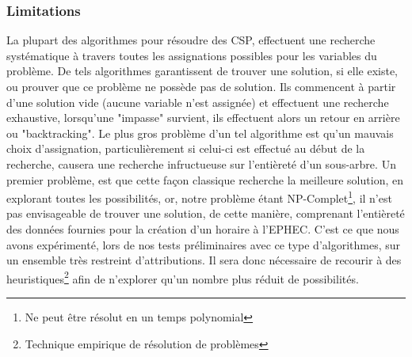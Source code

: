 \subsubsection{Limitations}
La plupart des algorithmes pour résoudre des CSP, effectuent une recherche systématique à travers toutes les assignations possibles pour les variables du problème. De tels algorithmes garantissent de trouver une solution, si elle existe, ou prouver que ce problème ne possède pas de solution.  
Ils commencent à partir d'une solution vide (aucune variable n'est assignée) et effectuent une recherche exhaustive,
lorsqu'une "impasse" survient, ils effectuent alors un retour en arrière ou "backtracking".  \newline
Le plus gros problème d'un tel algorithme est qu'un mauvais choix d'assignation,
 particulièrement si celui-ci est effectué au début de la recherche, causera une recherche infructueuse sur l'entièreté d'un sous-arbre. 
\newline
\indent
Un premier problème, est que cette façon classique recherche la meilleure solution, en explorant toutes les possibilités, or, notre problème étant NP-Complet\footnote{Ne peut être résolut en un temps polynomial}, il n'est pas envisageable de trouver une solution, de cette manière, comprenant l'entièreté des données fournies pour la création d'un horaire à l'EPHEC.  C'est ce que nous avons expérimenté, lors de nos tests préliminaires avec ce type d'algorithmes, sur un ensemble très restreint d'attributions. 
\newline
Il sera donc nécessaire de recourir à des heuristiques\footnote{Technique empirique de résolution de problèmes} afin de n'explorer qu'un nombre plus réduit de possibilités.
\newline

